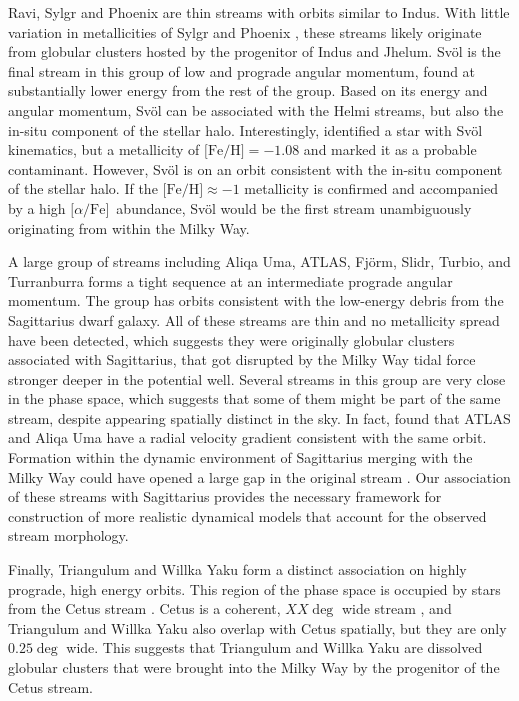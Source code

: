 \documentclass[twocolumn]{aastex63}
\newcommand{\feh}{\ensuremath{\textrm{[Fe/H]}}}
\newcommand{\afe}{\ensuremath{\textrm{[$\alpha$/Fe]}}}
\begin{document}
Ravi, Sylgr and Phoenix are thin streams with orbits similar to Indus.
With little variation in metallicities of Sylgr and Phoenix \citep{ibata2019, s5nature}, these streams likely originate from globular clusters hosted by the progenitor of Indus and Jhelum.
Sv\" ol is the final stream in this group of low and prograde angular momentum, found at substantially lower energy from the rest of the group.
Based on its energy and angular momentum, Sv\" ol can be associated with the Helmi streams, but also the in-situ component of the stellar halo.
Interestingly, \citet{ibata2019} identified a star with Sv\" ol kinematics, but a metallicity of $\feh=-1.08$ and marked it as a probable contaminant.
However, Sv\" ol is on an orbit consistent with the in-situ component of the stellar halo.
If the $\feh\approx-1$ metallicity is confirmed and accompanied by a high \afe\ abundance, Sv\" ol would be the first stream unambiguously originating from within the Milky Way.

A large group of streams including Aliqa Uma, ATLAS, Fj\" orm, Slidr, Turbio, and Turranburra forms a tight sequence at an intermediate prograde angular momentum.
The group has orbits consistent with the low-energy debris from the Sagittarius dwarf galaxy.
All of these streams are thin and no metallicity spread have been detected, which suggests they were originally globular clusters associated with Sagittarius, that got disrupted by the Milky Way tidal force stronger deeper in the potential well.
Several streams in this group are very close in the phase space, which suggests that some of them might be part of the same stream, despite appearing spatially distinct in the sky.
In fact, \citet{li2020} found that ATLAS and Aliqa Uma have a radial velocity gradient consistent with the same orbit.
Formation within the dynamic environment of Sagittarius merging with the Milky Way could have opened a large gap in the original stream \citep{bonaca2020b, erkal2020}.
Our association of these streams with Sagittarius provides the necessary framework for construction of more realistic dynamical models that account for the observed stream morphology.

Finally, Triangulum and Willka Yaku form a distinct association on highly prograde, high energy orbits.
This region of the phase space is occupied by stars from the Cetus stream \citep{yuan2019}.
Cetus is a coherent, $XX\deg$ wide stream \citep{newberg2009}, and Triangulum and Willka Yaku also overlap with Cetus spatially, but they are only $0.25\deg$ wide.
This suggests that Triangulum and Willka Yaku are dissolved globular clusters that were brought into the Milky Way by the progenitor of the Cetus stream.
\end{document}
